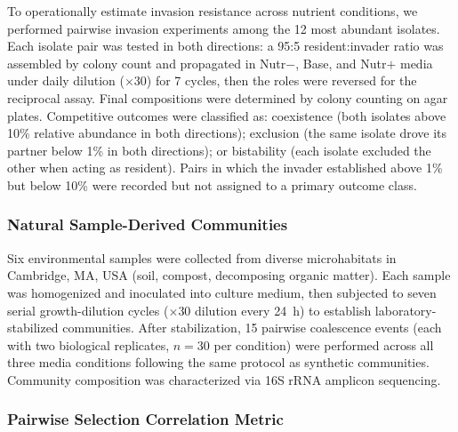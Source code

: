 To operationally estimate invasion resistance across nutrient conditions, we performed pairwise invasion experiments among the 12 most abundant isolates. Each isolate pair was tested in both directions: a 95:5 resident:invader ratio was assembled by colony count and propagated in Nutr$-$, Base, and Nutr$+$ media under daily dilution ($\times$30) for 7 cycles, then the roles were reversed for the reciprocal assay. Final compositions were determined by colony counting on agar plates. Competitive outcomes were classified as: coexistence (both isolates above 10\% relative abundance in both directions); exclusion (the same isolate drove its partner below 1\% in both directions); or bistability (each isolate excluded the other when acting as resident). Pairs in which the invader established above 1\% but below 10\% were recorded but not assigned to a primary outcome class. 


\subsubsection*{Natural Sample-Derived Communities}
\label{sec:suppl:natural}

Six environmental samples were collected from diverse microhabitats in Cambridge, MA, USA (soil, compost, decomposing organic matter). Each sample was homogenized and inoculated into culture medium, then subjected to seven serial growth-dilution cycles ($\times$30 dilution every 24~h) to establish laboratory-stabilized communities. After stabilization, 15 pairwise coalescence events (each with two biological replicates, $n = 30$ per condition) were performed across all three media conditions following the same protocol as synthetic communities. Community composition was characterized via 16S rRNA amplicon sequencing.


\subsubsection*{Pairwise Selection Correlation Metric}
\label{sec:suppl:methods:concordance}

